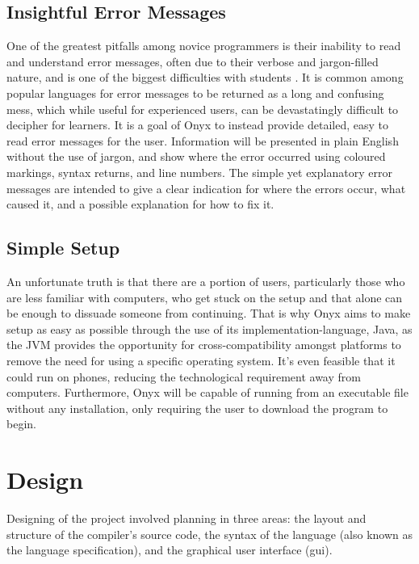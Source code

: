 \documentclass[
]{report}
\begin{document}
\section{Insightful Error Messages}
One of the greatest pitfalls among novice programmers is their inability
to read and understand error messages, often due to their verbose and
jargon-filled nature, and is one of the biggest difficulties with
students \cite{pedagogical-report}. It is common among popular languages for error
messages to be returned as a long and confusing mess, which while useful
for experienced users, can be devastatingly difficult to decipher for
learners. It is a goal of Onyx to instead provide detailed, easy to read
error messages for the user. Information will be presented in plain
English without the use of jargon, and show where the error occurred
using coloured markings, syntax returns, and line numbers. The simple
yet explanatory error messages are intended to give a clear indication
for where the errors occur, what caused it, and a possible
explanation for how to fix it.

\section{Simple Setup}
An unfortunate truth is that there are a portion of users, particularly
those who are less familiar with computers, who get stuck on the setup and that alone can be
enough to dissuade someone from continuing. That is why Onyx aims to
make setup as easy as possible through the use of its \gls{implementation-language}, Java, 
as the JVM provides the opportunity for cross-compatibility amongst platforms to
remove the need for using a specific operating system. It's even feasible
that it could run on phones, reducing the technological requirement away
from computers. Furthermore, Onyx will be capable of running from an
executable file without any installation, only requiring the user to
download the program to begin.

\chapter{Design}
Designing of the project involved planning in three areas: the layout
and structure of the compiler's source code, the syntax of the language
(also known as the language specification), and the graphical user
interface (\acrshort{gui}).
\end{document}
